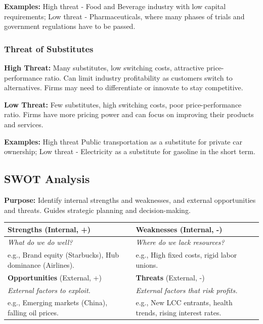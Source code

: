 \textbf{Examples:} High threat - Food and Beverage industry with low capital
requirements; Low threat - Pharmaceuticals, where many phases of trials and
government regulations have to be passed.

\subsubsection{Threat of Substitutes}
\textbf{High Threat:} Many substitutes, low switching costs, attractive
price-performance ratio. Can limit industry profitability as customers switch
to alternatives. Firms may need to differentiate or innovate to stay
competitive.

\textbf{Low Threat:} Few substitutes, high switching costs, poor price-performance
ratio. Firms have more pricing power and can focus on improving their products
and services.

\textbf{Examples:} High threat Public transportation as a substitute for private car
ownership; Low threat - Electricity as a substitute for gasoline in the short
term.

\subsection{SWOT Analysis}
\textbf{Purpose:} Identify internal strengths and weaknesses, and external
opportunities and threats. Guides strategic planning and decision-making.
\begin{tabularx}{\linewidth}{|X|X|}
    \hline
    \rowcolor{gray!20} \textbf{Strengths} (Internal, +)     & \textbf{Weaknesses} (Internal, -)                             \\ \hline
    \textit{What do we do well?}                            & \textit{Where do we lack resources?}                          \\ e.g., Brand equity (Starbucks), Hub dominance
    (Airlines).                                             & e.g., High fixed costs, rigid labor unions.                   \\ \hline
    \rowcolor{gray!20} \textbf{Opportunities} (External, +) & \textbf{Threats} (External, -)                                \\ \hline
    \textit{External factors to exploit.}                   & \textit{External factors that risk profits.}                  \\ e.g., Emerging markets (China), falling
    oil prices.                                             & e.g., New LCC entrants, health trends, rising interest rates. \\
    \hline
\end{tabularx}

